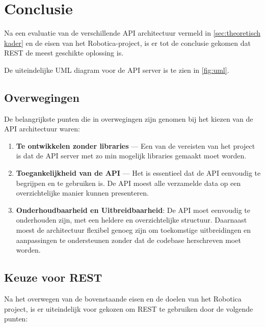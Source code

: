 \section{Conclusie}
\label{sec:conclusie}

Na een evaluatie van de verschillende API architectuur vermeld in \autoref{sec:theoretisch kader}
en de eisen van het Robotica-project, is er tot de conclusie gekomen dat REST
de meest geschikte oplossing is.

De uiteindelijke UML diagram voor de API server is te zien in \autoref{fig:uml}.

\subsection{Overwegingen}
\label{ssec:overwegingen}
De belangrijkste punten die in overwegingen zijn genomen bij het kiezen van de
API architectuur waren:

\begin{enumerate}
    \item \textbf{Te ontwikkelen zonder libraries} --- Een van de vereisten van
     het project is dat de API server met zo min mogelijk libraries gemaakt moet
     worden.
    \item \textbf{Toegankelijkheid van de API} --- Het is essentieel dat de
     API eenvoudig te begrijpen en te gebruiken is. De API moest alle verzamelde
     data op een overzichtelijke manier kunnen presenteren.
    \item \textbf{Onderhoudbaarheid en Uitbreidbaarheid}: De API moet eenvoudig
    te onderhouden zijn, met een heldere en overzichtelijke structuur. Daarnaast
    moest de architectuur flexibel genoeg zijn om toekomstige uitbreidingen en
     aanpassingen te ondersteunen zonder dat de codebase herschreven moet worden.
\end{enumerate}

\subsection{Keuze voor REST}
Na het overwegen van de bovenstaande eisen en de doelen van het Robotica project,
is er uiteindelijk voor gekozen om REST te gebruiken door de volgende punten:

